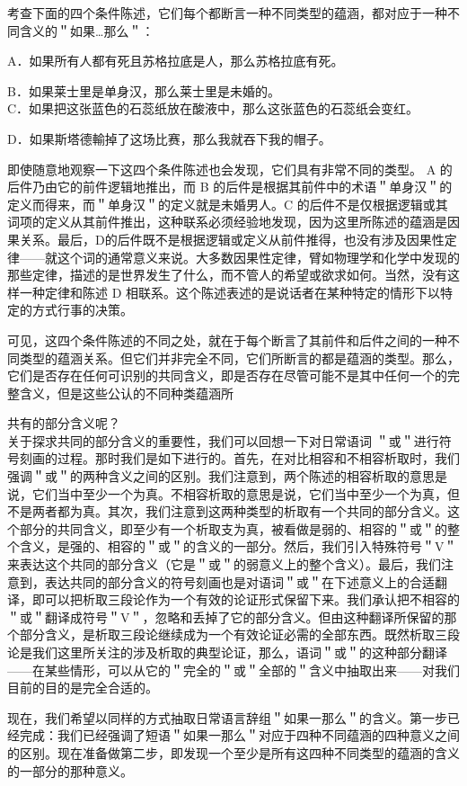 考查下面的四个条件陈述，它们每个都断言一种不同类型的蕴涵，都对应于一种不同含义的＂如果…那么＂：

A．如果所有人都有死且苏格拉底是人，那么苏格拉底有死。

B．如果莱士里是单身汉，那么莱士里是未婚的。\\
C．如果把这张蓝色的石蕊纸放在酸液中，那么这张蓝色的石蕊纸会变红。

D．如果斯塔德輸掉了这场比赛，那么我就吞下我的帽子。

即使随意地观察一下这四个条件陈述也会发现，它们具有非常不同的类型。 A 的后件乃由它的前件逻辑地推出，而 B 的后件是根据其前件中的术语＂单身汉＂的定义而得来，而＂单身汉＂的定义就是未婚男人。C 的后件不是仅根据逻辑或其词项的定义从其前件推出，这种联系必须经验地发现，因为这里所陈述的蕴涵是因果关系。最后，D的后件既不是根据逻辑或定义从前件推得，也没有涉及因果性定律——就这个词的通常意义来说。大多数因果性定律，臂如物理学和化学中发现的那些定律，描述的是世界发生了什么，而不管人的希望或欲求如何。当然，没有这样一种定律和陈述 D 相联系。这个陈述表述的是说话者在某种特定的情形下以特定的方式行事的决策。

可见，这四个条件陈述的不同之处，就在于每个断言了其前件和后件之间的一种不同类型的蕴涵关系。但它们并非完全不同，它们所断言的都是蕴涵的类型。那么，它们是否存在任何可识别的共同含义，即是否存在尽管可能不是其中任何一个的完整含义，但是这些公认的不同种类蕴涵所

共有的部分含义呢？\\
关于探求共同的部分含义的重要性，我们可以回想一下对日常语词 ＂或＂进行符号刻画的过程。那时我们是如下进行的。首先，在对比相容和不相容析取时，我们强调＂或＂的两种含义之间的区别。我们注意到，两个陈述的相容析取的意思是说，它们当中至少一个为真。不相容析取的意思是说，它们当中至少一个为真，但不是两者都为真。其次，我们注意到这两种类型的析取有一个共同的部分含义。这个部分的共同含义，即至少有一个析取支为真，被看做是弱的、相容的＂或＂的整个含义，是强的、相容的＂或＂的含义的一部分。然后，我们引入特殊符号＂V＂来表达这个共同的部分含义（它是＂或＂的弱意义上的整个含义）。最后，我们注意到，表达共同的部分含义的符号刻画也是对语词＂或＂在下述意义上的合适翻译，即可以把析取三段论作为一个有效的论证形式保留下来。我们承认把不相容的＂或＂翻译成符号＂V＂，忽略和丢掉了它的部分含义。但由这种翻译所保留的那个部分含义，是析取三段论继续成为一个有效论证必需的全部东西。既然析取三段论是我们这里所关注的涉及析取的典型论证，那么，语词＂或＂的这种部分翻译——在某些情形，可以从它的＂完全的＂或＂全部的＂含义中抽取出来——对我们目前的目的是完全合适的。

现在，我们希望以同样的方式抽取日常语言辞组＂如果一那么＂的含义。第一步已经完成：我们已经强调了短语＂如果一那么＂对应于四种不同蕴涵的四种意义之间的区别。现在准备做第二步，即发现一个至少是所有这四种不同类型的蕴涵的含义的一部分的那种意义。

